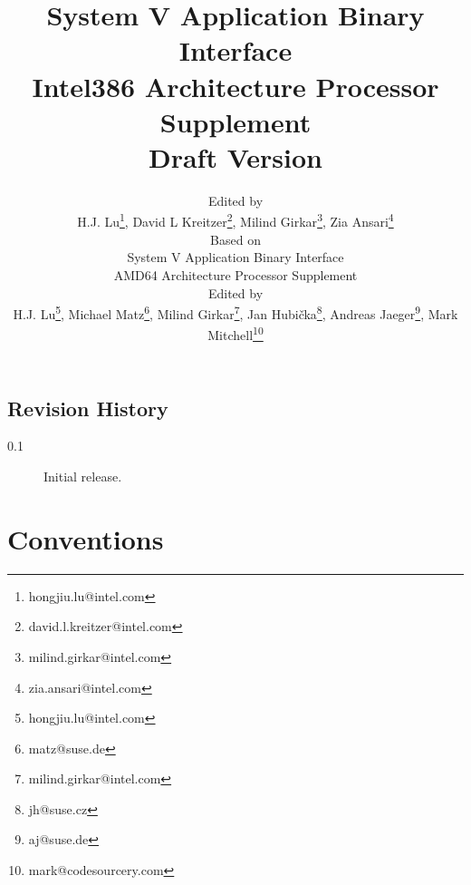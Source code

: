 \documentclass[12pt]{report}
\begin{document}
\author{Edited by\\
  H.J. Lu\thanks{hongjiu.lu@intel.com},
  David L Kreitzer\thanks{david.l.kreitzer@intel.com},
  Milind Girkar\thanks{milind.girkar@intel.com},
  Zia Ansari\thanks{zia.ansari@intel.com} \\
  \small
  Based on\\
  \small
  System V Application Binary Interface\\
  \small
  AMD64 Architecture Processor Supplement\\
  \small
  Edited by\\
  \small
  H.J. Lu\thanks{hongjiu.lu@intel.com},
  Michael Matz\thanks{matz@suse.de},
  Milind Girkar\thanks{milind.girkar@intel.com},
  Jan Hubi\v{c}ka\thanks{jh@suse.cz},
  Andreas Jaeger\thanks{aj@suse.de},
  Mark Mitchell\thanks{mark@codesourcery.com}}

\title{System V Application Binary Interface\\
{\Large Intel386 Architecture Processor Supplement\\
Draft Version \version}}
\maketitle
\tableofcontents
\listoftables
\listoffigures

\section*{Revision History}

\begin{description}

\item[0.1] Initial release.
\end{description}










\chapter{Conventions}




\appendix


\end{document}
